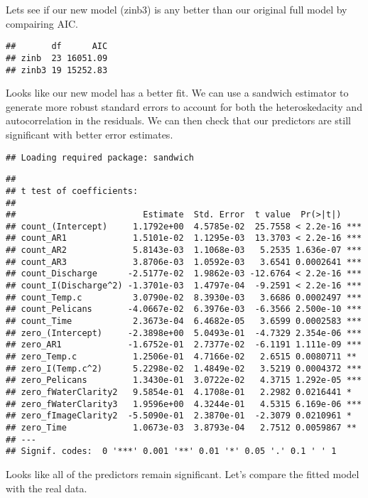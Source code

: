 \documentclass[]{article}
\begin{document}
Lets see if our new model (zinb3) is any better than our original full
model by compairing AIC.

\begin{verbatim}
##       df      AIC
## zinb  23 16051.09
## zinb3 19 15252.83
\end{verbatim}

Looks like our new model has a better fit. We can use a sandwich
estimator to generate more robust standard errors to account for both
the heteroskedacity and autocorrelation in the residuals. We can then
check that our predictors are still significant with better error
estimates.

\begin{verbatim}
## Loading required package: sandwich
\end{verbatim}

\begin{verbatim}
## 
## t test of coefficients:
## 
##                         Estimate  Std. Error  t value  Pr(>|t|)    
## count_(Intercept)     1.1792e+00  4.5785e-02  25.7558 < 2.2e-16 ***
## count_AR1             1.5101e-02  1.1295e-03  13.3703 < 2.2e-16 ***
## count_AR2             5.8143e-03  1.1068e-03   5.2535 1.636e-07 ***
## count_AR3             3.8706e-03  1.0592e-03   3.6541 0.0002641 ***
## count_Discharge      -2.5177e-02  1.9862e-03 -12.6764 < 2.2e-16 ***
## count_I(Discharge^2) -1.3701e-03  1.4797e-04  -9.2591 < 2.2e-16 ***
## count_Temp.c          3.0790e-02  8.3930e-03   3.6686 0.0002497 ***
## count_Pelicans       -4.0667e-02  6.3976e-03  -6.3566 2.500e-10 ***
## count_Time            2.3673e-04  6.4682e-05   3.6599 0.0002583 ***
## zero_(Intercept)     -2.3898e+00  5.0493e-01  -4.7329 2.354e-06 ***
## zero_AR1             -1.6752e-01  2.7377e-02  -6.1191 1.111e-09 ***
## zero_Temp.c           1.2506e-01  4.7166e-02   2.6515 0.0080711 ** 
## zero_I(Temp.c^2)      5.2298e-02  1.4849e-02   3.5219 0.0004372 ***
## zero_Pelicans         1.3430e-01  3.0722e-02   4.3715 1.292e-05 ***
## zero_fWaterClarity2   9.5854e-01  4.1708e-01   2.2982 0.0216441 *  
## zero_fWaterClarity3   1.9596e+00  4.3244e-01   4.5315 6.169e-06 ***
## zero_fImageClarity2  -5.5090e-01  2.3870e-01  -2.3079 0.0210961 *  
## zero_Time             1.0673e-03  3.8793e-04   2.7512 0.0059867 ** 
## ---
## Signif. codes:  0 '***' 0.001 '**' 0.01 '*' 0.05 '.' 0.1 ' ' 1
\end{verbatim}

Looks like all of the predictors remain significant. Let's compare the
fitted model with the real data.
\end{document}
